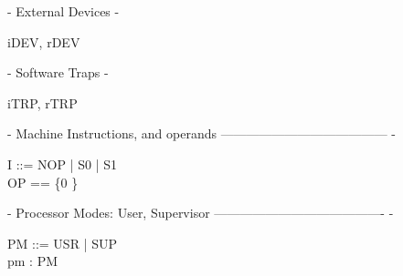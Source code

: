 {- External Devices -}
\begin{circus}

\circchannel iDEV, rDEV
\end{circus}

{- Software Traps -}
\begin{circus}
\circchannel iTRP, rTRP
\end{circus}

{- Machine Instructions, and operands --------------------------------------- -}
\begin{circus}

I ::=
  NOP   %
  | S0    %
  | S1\\    %

OP == \{0 \}

\end{circus}

{- Processor Modes: User, Supervisor ---------------------------------------- -}
\begin{circus}
PM ::=
 USR   %
 | SUP\\   %

\circchannel pm : PM   %
\end{circus}
